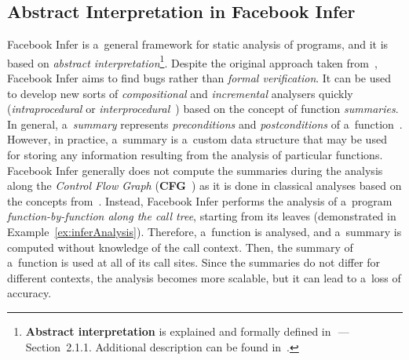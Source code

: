 \documentclass{ExcelAtFIT}
\theoremstyle{definition}
\begin{document}
\subsection{Abstract Interpretation in Facebook Infer}

Facebook Infer is a~general framework for static analysis of programs, and it is based on \emph{abstract interpretation}\footnote{\textbf{Abstract interpretation} is explained and formally defined in~\cite{harmimBP}\,---\,Section~2.1.1. Additional description can be found in~\cite{AILatticeModelCousot, wideningNarrowingCousot, programAnalysisNielson, staticAnalysisRival, staticAnalysisMoller}.}. Despite the original approach taken from~\cite{inferBiabduction}, Facebook Infer aims to find bugs rather than \emph{formal verification}. It can be used to develop new sorts of \emph{compositional} and \emph{incremental} analysers quickly (\emph{intraprocedural} or \emph{interprocedural}~\cite{programAnalysisNielson}) based on the concept of function \emph{summaries}. In general, a~\emph{summary} represents \emph{preconditions} and \emph{postconditions} of a~function~\cite{hoare}. However, in practice, a~summary is a~custom data structure that may be used for storing any information resulting from the analysis of particular functions. Facebook Infer generally does not compute the summaries during the analysis along the \emph{Control Flow Graph} (\textbf{CFG}~\cite{controlFlowAnalysisAllen}) as it is done in classical analyses based on the concepts from~\cite{DFAGraphReach, DFAApproaches}. Instead, Facebook Infer performs the analysis of a~program \emph{function-by-function along the call tree}, starting from its leaves (demonstrated in Example~\ref{ex:inferAnalysis}). Therefore, a~function is analysed, and a~summary is computed without knowledge of the call context. Then, the summary of a~function is used at all of its call sites. Since the summaries do not differ for different contexts, the analysis becomes more scalable, but it can lead to a~loss of accuracy.
\end{document}
